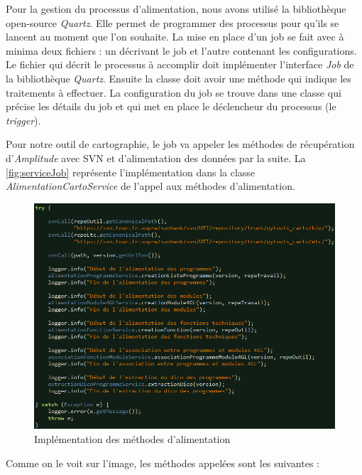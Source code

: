 \documentclass{polytech/polytech}
\begin{document}
Pour la gestion du processus d'alimentation, nous avons utilisé la bibliothèque open-source \textit{Quartz}. Elle permet de programmer des processus pour qu'ils se lancent au moment que l'on souhaite. La mise en place d'un job se fait avec à minima deux fichiers : un décrivant le job et l'autre contenant les configurations. Le fichier qui décrit le processus à accomplir doit implémenter l'interface \textit{Job} de la bibliothèque \textit{Quartz}. Ensuite la classe doit avoir une méthode  qui indique les traitements à effectuer. La configuration du job se trouve dans une classe qui précise les détails du job et qui met en place le déclencheur du processus (le \textit{trigger}). 

Pour notre outil de cartographie, le job va appeler les méthodes de récupération d'\textit{Amplitude} avec SVN et d'alimentation des données par la suite. La \autoref{fig:serviceJob} représente l'implémentation dans la classe \textit{AlimentationCartoService} de l'appel aux méthodes d'alimentation.


\begin{figure}
	\includegraphics[scale=0.7]{images/serviceJob}
	\caption{Implémentation des méthodes d'alimentation}
	\label{fig:serviceJob}
\end{figure}

Comme on le voit sur l'image, les méthodes appelées sont les suivantes :
\end{document}
